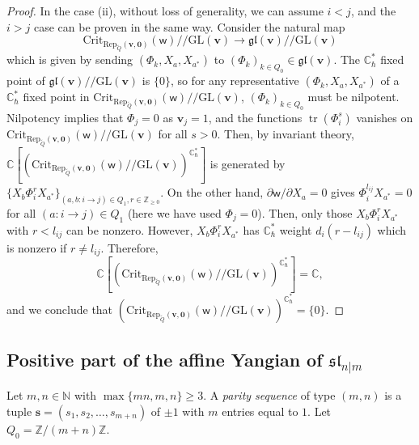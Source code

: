 \documentclass[10pt]{amsart}
\theoremstyle{definition}
\numberwithin{equation}{section}
\newcommand{\GL}{\mathrm{GL}}
\newcommand{\Crit}{\mathrm{Crit}}
\newcommand{\bC}{\mathbb{C}}
\newcommand{\bN}{\mathbb{N}}
\newcommand{\bZ}{\mathbb{Z}}
\newcommand{\bv}{\mathbf{v}}
\newcommand{\sw}{\mathsf{w}}
\newcommand{\tr}{\operatorname{tr}}
\begin{document}
\begin{proof}
In the case (ii), without loss of generality, we can assume $i<j$, and the $i>j$ case can be proven in the same way. Consider the natural map $$\Crit_{\mathrm{Rep}_{\widetilde{Q}}(\bv,\mathbf 0)}(\sw)/\!\!/\GL(\bv)\to \mathfrak{gl}(\bv)/\!\!/\GL(\bv)$$
which is given by sending $(\Phi_k,X_a,X_{a^*})$ to $(\Phi_k)_{k\in Q_0}\in \mathfrak{gl}(\bv)$. The $\bC^*_\hbar$ fixed point of $\mathfrak{gl}(\bv)/\!\!/\GL(\bv)$ is $\{0\}$, so for any representative $(\Phi_k,X_a,X_{a^*})$ of a $\bC^*_\hbar$ fixed point in $\Crit_{\mathrm{Rep}_{\widetilde{Q}}(\bv,\mathbf 0)}(\sw)/\!\!/\GL(\bv)$, $(\Phi_k)_{k\in Q_0}$ must be nilpotent. Nilpotency implies that $\Phi_j=0$ as $\bv_j=1$, and the functions $\tr(\Phi_i^s)$ vanishes on $\Crit_{\mathrm{Rep}_{\widetilde{Q}}(\bv,\mathbf 0)}(\sw)/\!\!/\GL(\bv)$ for all $s>0$. Then, by invariant theory, $\bC\left[\left(\Crit_{\mathrm{Rep}_{\widetilde{Q}}(\bv,\mathbf 0)}(\sw)/\!\!/\GL(\bv)\right)^{\bC^*_\hbar}\right]$ is generated by $\{X_b\Phi_i^rX_{a^*}\}_{(a,b:i\to j)\in Q_1,r\in \bZ_{\geqslant0}}$. On the other hand, $\partial\sw/\partial X_a=0$ gives $\Phi_i^{l_{ij}}X_{a^*}=0$ for all $(a:i\to j)\in Q_1$ (here we have used $\Phi_j=0$). Then, only those $X_b\Phi_i^rX_{a^*}$ with $r<l_{ij}$ can be nonzero. However, $X_b\Phi_i^rX_{a^*}$ has $\bC^*_\hbar$ weight $d_i(r-l_{ij})$ which is nonzero if $r\neq l_{ij}$. Therefore, $$\bC\left[\left(\Crit_{\mathrm{Rep}_{\widetilde{Q}}(\bv,\mathbf 0)}(\sw)/\!\!/\GL(\bv)\right)^{\bC^*_\hbar}\right]=\bC,$$
and we conclude that $\left(\Crit_{\mathrm{Rep}_{\widetilde{Q}}(\bv,\mathbf 0)}(\sw)/\!\!/\GL(\bv)\right)^{\bC^*_\hbar}=\{0\}$.
\end{proof}



\subsection{Positive part of the affine Yangian of \texorpdfstring{$\mathfrak{sl}_{n|m}$}{sl(n|m)}}\label{sec super affine Yangian}


Let $m,n\in \bN$ with $\max\{mn,m,n\}\geqslant3$. A \textit{parity sequence} of type $(m,n)$ is a tuple $\mathbf s=(s_1,s_2,\ldots,s_{m+n})$ of $\pm 1$ 
with $m$ entries equal to $1$. Let $Q_0=\bZ/(m+n)\bZ$. 
\end{document}
